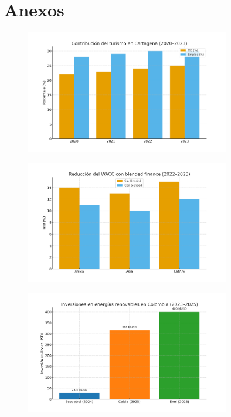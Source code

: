 \appendix

\section*{Anexos}

\begin{figure}[H]
    \centering
    \includegraphics[width=0.8\textwidth]{Appendix/1.png}\label{fig:anexo1}
    \caption{}
\end{figure}

\begin{figure}[H]
    \centering
    \includegraphics[width=0.8\textwidth]{Appendix/2.png}\label{fig:anexo2}
    \caption{}
\end{figure}

\begin{figure}[H]
    \centering
    \includegraphics[width=0.8\textwidth]{Appendix/3.png}\label{fig:anexo3}
    \caption{}
\end{figure}

